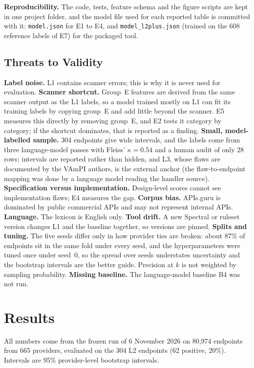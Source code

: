 \documentclass[conference]{IEEEtran}
\begin{document}
\textbf{Reproducibility.} The code, tests, feature schema and the figure scripts are kept in
one project folder, and the model file used for each reported table is committed with it: \texttt{model.json} for E1 to E4, and \texttt{model\_l2plus.json} (trained on the 608 reference labels of E7) for the packaged tool.

\subsection{Threats to Validity}
\textbf{Label noise.} L1 contains scanner errors; this is why it is never used for evaluation.
\textbf{Scanner shortcut.} Group~E features are derived from the same scanner output as the
L1 labels, so a model trained mostly on L1 can fit its training labels by copying group~E and
add little beyond the scanner. E5 measures this directly by removing group~E, and E2 tests it
category by category; if the shortcut dominates, that is reported as a finding.
\textbf{Small, model-labelled sample.} 304 endpoints give wide intervals, and the labels come from three language-model passes with Fleiss' $\kappa=0.54$ and a human audit of only 28 rows; intervals are reported rather
than hidden, and L3, whose flaws are documented by the VAmPI authors, is the external anchor (the flaw-to-endpoint mapping was done by a language model reading the handler source). \textbf{Specification versus implementation.} Design-level scores cannot see
implementation flaws; E4 measures the gap. \textbf{Corpus bias.} APIs.guru is dominated by
public commercial APIs and may not represent internal APIs. \textbf{Language.} The lexicon is
English only. \textbf{Tool drift.} A new Spectral or ruleset version changes L1 and the
baseline together, so versions are pinned. \textbf{Splits and tuning.} The five seeds differ only in how provider ties are broken: about 87\% of endpoints sit in the same fold under every seed, and the hyperparameters were tuned once under seed~0, so the spread over seeds understates uncertainty and the bootstrap intervals are the better guide. Precision at $k$ is not weighted by sampling probability. \textbf{Missing baseline.} The language-model baseline B4 was not run.

\section{Results}
\label{sec:results}
All numbers come from the frozen run of 6 November 2026 on 80{,}974 endpoints from 665 providers,
evaluated on the 304 L2 endpoints (62 positive, 20\%). Intervals are 95\% provider-level bootstrap intervals.
\end{document}

